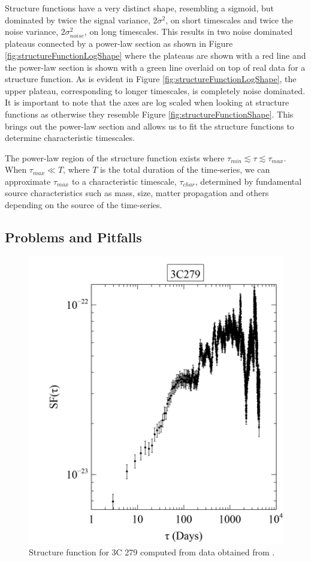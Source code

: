 \documentclass[12pt, oneside]{smuthesis}
\begin{document}
Structure functions have a very distinct shape, resembling a sigmoid, but dominated by twice the signal variance, $2\sigma^{2}$, on short timescales and twice the noise variance, $2\sigma_{noise}^{2}$, on long timescales. This results in two noise dominated plateaus connected by a power-law section as shown in Figure \ref{fig:structureFunctionLogShape} where the plateaus are shown with a red line and the power-law section is shown with a green line overlaid on top of real data for a structure function. As is evident in Figure \ref{fig:structureFunctionLogShape}, the upper plateau, corresponding to longer timescales, is completely noise dominated. It is important to note that the axes are log scaled when looking at structure functions as otherwise they resemble Figure \ref{fig:structureFunctionShape}. This brings out the power-law section and allows us to fit the structure functions to determine characteristic timescales.

The power-law region of the structure function exists where $\tau_{min}\lesssim\tau\lesssim\tau_{max}$. When $\tau_{max}\ll T$, where $T$ is the total duration of the time-series, we can approximate $\tau_{max}$ to a characteristic timescale, $\tau_{char}$, determined by fundamental source characteristics such as mass, size, matter propagation and others depending on the source of the time-series.

\subsection{\sc Problems and Pitfalls} \label{problemsAndPitfalls}

\begin{figure}[H]
	\centering
	\includegraphics[width=0.6\linewidth]{3C279structurefunction}
	\caption{Structure function for 3C 279 computed from data obtained from \cite{rxtepaper}.}
	\label{fig:3c279sf}
\end{figure}
\end{document}
